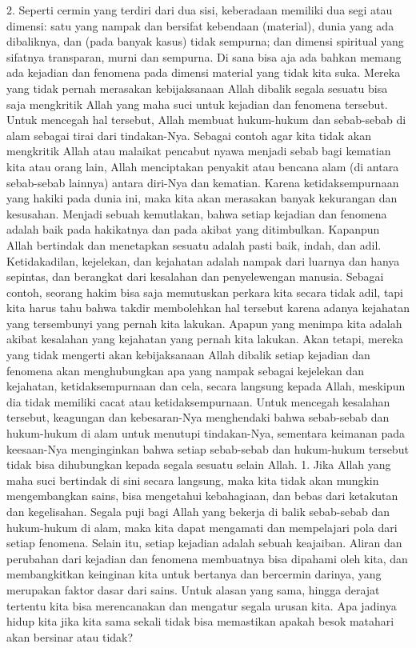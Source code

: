 \documentclass[]{article}
\begin{document}
2. Seperti cermin yang terdiri dari dua sisi, keberadaan memiliki dua segi atau dimensi: satu yang nampak dan bersifat kebendaan (material), dunia yang ada dibaliknya, dan (pada banyak kasus) tidak sempurna; dan dimensi spiritual yang sifatnya transparan, murni dan sempurna. Di sana bisa aja ada bahkan memang ada kejadian dan fenomena pada dimensi material yang tidak kita suka. Mereka yang tidak pernah merasakan kebijaksanaan Allah dibalik segala sesuatu bisa saja mengkritik Allah yang  maha suci untuk kejadian dan fenomena tersebut. Untuk mencegah hal tersebut, Allah membuat hukum-hukum dan sebab-sebab di alam sebagai tirai dari tindakan-Nya.  Sebagai contoh agar kita tidak akan mengkritik Allah atau malaikat pencabut nyawa menjadi sebab bagi kematian kita atau orang lain,   Allah menciptakan penyakit atau bencana alam (di antara sebab-sebab lainnya) antara diri-Nya dan kematian.
Karena ketidaksempurnaan yang hakiki pada dunia ini, maka kita akan merasakan banyak kekurangan dan kesusahan.  Menjadi sebuah kemutlakan, bahwa setiap kejadian dan fenomena adalah baik pada hakikatnya dan pada akibat yang ditimbulkan. Kapanpun Allah bertindak dan menetapkan sesuatu adalah pasti baik, indah, dan adil. Ketidakadilan, kejelekan,  dan kejahatan adalah nampak dari luarnya dan hanya sepintas, dan berangkat dari kesalahan dan penyelewengan manusia. Sebagai contoh, seorang hakim bisa saja memutuskan perkara kita secara tidak adil, tapi kita harus tahu bahwa takdir membolehkan hal tersebut karena adanya kejahatan yang tersembunyi yang pernah kita lakukan. Apapun yang menimpa kita adalah akibat kesalahan yang kejahatan yang pernah kita lakukan.  Akan tetapi, mereka yang tidak mengerti akan kebijaksanaan Allah dibalik setiap kejadian dan fenomena akan menghubungkan apa yang nampak sebagai kejelekan dan kejahatan, ketidaksempurnaan dan cela, secara langsung kepada Allah, meskipun dia tidak memiliki cacat atau ketidaksempurnaan. 
Untuk mencegah kesalahan tersebut, keagungan dan kebesaran-Nya menghendaki bahwa sebab-sebab dan hukum-hukum di alam untuk menutupi tindakan-Nya, sementara keimanan pada keesaan-Nya menginginkan bahwa setiap sebab-sebab dan hukum-hukum tersebut tidak bisa dihubungkan kepada segala sesuatu selain Allah. 
1. Jika Allah yang maha suci bertindak di sini secara langsung, maka kita tidak akan mungkin mengembangkan sains, bisa mengetahui kebahagiaan, dan bebas dari ketakutan dan kegelisahan. Segala puji bagi Allah yang bekerja di balik sebab-sebab dan hukum-hukum di alam, maka kita dapat mengamati dan mempelajari pola dari setiap fenomena. Selain itu, setiap kejadian adalah sebuah keajaiban. Aliran dan perubahan dari kejadian dan fenomena membuatnya bisa dipahami oleh kita, dan membangkitkan keinginan kita untuk bertanya dan bercermin darinya, yang merupakan faktor dasar dari sains. Untuk alasan yang sama, hingga derajat tertentu kita bisa merencanakan dan mengatur segala urusan kita. Apa jadinya hidup kita jika kita sama sekali tidak bisa memastikan apakah besok matahari akan bersinar atau tidak?
\end{document}
